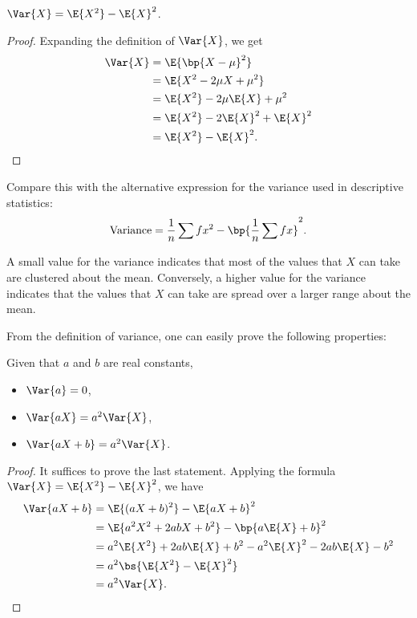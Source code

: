 \begin{proposition}
    $\Var{X} = \E{X^2} - \E{X}^2$.
\end{proposition}
\begin{proof}
    Expanding the definition of $\Var{X}$, we get
    \begin{align*}
        \Var{X} &= \E{\bp{X - \m}^2}\\
        &= \E{X^2 - 2\m X + \m^2}\\
        &= \E{X^2} - 2\m \E{X} + \m^2\\
        &= \E{X^2} - 2\E{X}^2 + \E{X}^2\\
        &= \E{X^2} - \E{X}^2.
    \end{align*}
\end{proof}

Compare this with the alternative expression for the variance used in descriptive statistics: \[\text{Variance} = \frac1n \sum fx^2 - \bp{\frac1n \sum fx}^2.\]

A small value for the variance indicates that most of the values that $X$ can take are clustered about the mean. Conversely, a higher value for the variance indicates that the values that $X$ can take are spread over a larger range about the mean.

From the definition of variance, one can easily prove the following properties:
\begin{proposition}
    Given that $a$ and $b$ are real constants,
    \begin{itemize}
        \item $\Var{a} = 0$,
        \item $\Var{aX} = a^2 \Var{X}$,
        \item $\Var{aX + b} = a^2 \Var{X}$.
    \end{itemize}
\end{proposition}
\begin{proof}
    It suffices to prove the last statement. Applying the formula $\Var{X} = \E{X^2} - \E{X}^2$, we have
    \begin{align*}
        \Var{aX + b} &= \E{(aX + b)^2} - \E{aX + b}^2\\
        &= \E{a^2 X^2 + 2ab X + b^2} - \bp{a\E{X} + b}^2\\
        &= a^2\E{X^2} + 2ab \E{X} + b^2 - a^2 \E{X}^2 - 2ab \E{X} - b^2\\
        &= a^2 \bs{\E{X^2} -\E{X}^2}\\
        &= a^2 \Var{X}.
    \end{align*}
\end{proof}

